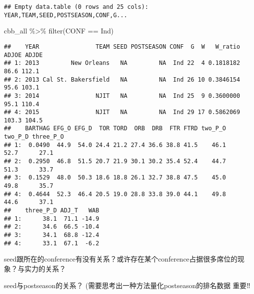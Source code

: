 \documentclass[
]{article}
\newenvironment{Shaded}{\begin{snugshade}}{\end{snugshade}}
\newcommand{\FunctionTok}[1]{\textcolor[rgb]{0.00,0.00,0.00}{#1}}
\newcommand{\NormalTok}[1]{#1}
\newcommand{\SpecialCharTok}[1]{\textcolor[rgb]{0.00,0.00,0.00}{#1}}
\newcommand{\StringTok}[1]{\textcolor[rgb]{0.31,0.60,0.02}{#1}}
\begin{document}
\begin{verbatim}
## Empty data.table (0 rows and 25 cols): YEAR,TEAM,SEED,POSTSEASON,CONF,G...
\end{verbatim}

\begin{Shaded}
\begin{Highlighting}[]
\NormalTok{cbb\_all }\SpecialCharTok{\%\textgreater{}\%} 
  \FunctionTok{filter}\NormalTok{(CONF }\SpecialCharTok{==} \StringTok{\textquotesingle{}Ind\textquotesingle{}}\NormalTok{)}
\end{Highlighting}
\end{Shaded}

\begin{verbatim}
##    YEAR                TEAM SEED POSTSEASON CONF  G  W   W_ratio ADJOE ADJDE
## 1: 2013         New Orleans   NA         NA  Ind 22  4 0.1818182  86.6 112.1
## 2: 2013 Cal St. Bakersfield   NA         NA  Ind 26 10 0.3846154  95.6 103.1
## 3: 2014                NJIT   NA         NA  Ind 25  9 0.3600000  95.1 110.4
## 4: 2015                NJIT   NA         NA  Ind 29 17 0.5862069 103.3 104.5
##    BARTHAG EFG_O EFG_D  TOR TORD  ORB  DRB  FTR FTRD two_P_O two_P_D three_P_O
## 1:  0.0490  44.9  54.0 24.4 21.2 27.4 36.6 38.8 41.5    46.1    52.7      27.1
## 2:  0.2950  46.8  51.5 20.7 21.9 30.1 30.2 35.4 52.4    44.7    51.3      33.7
## 3:  0.1529  48.0  50.3 18.6 18.8 26.1 32.7 38.8 47.5    45.0    49.8      35.7
## 4:  0.4644  52.3  46.4 20.5 19.0 28.8 33.8 39.0 44.1    49.8    44.6      37.1
##    three_P_D ADJ_T   WAB
## 1:      38.1  71.1 -14.9
## 2:      34.6  66.5 -10.4
## 3:      34.1  68.8 -12.4
## 4:      33.1  67.1  -6.2
\end{verbatim}

seed跟所在的conference有没有关系？或许存在某个conference占据很多席位的现象？与实力的关系？

seed与postseason的关系？ (需要思考出一种方法量化postseason的排名数据
重要‼️
\end{document}
